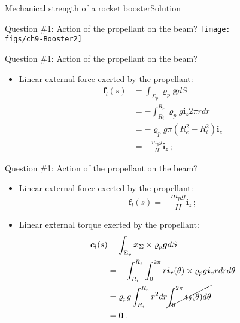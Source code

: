 \documentclass{beamer}
\newcommand{\id}{d}
\newcommand{\cj}{c}
\newcommand{\cv}{{\boldsymbol\cj}}
\newcommand{\xj}{x}
\newcommand{\zj}{z}
\newcommand{\xv}{{\boldsymbol\xj}}
\renewcommand{\ij}{i}
\newcommand{\iv}{{\boldsymbol\ij}}
\newcommand{\fj}{f}
\newcommand{\gj}{g}
\newcommand{\fv}{{\boldsymbol\fj}}
\newcommand{\gv}{{\boldsymbol\gj}}
\newcommand{\roi}{\varrho}
\newcommand{\bzero}{{\bf 0}}
\begin{document}
\begin{frame}{Mechanical strength of a rocket booster}{Solution}

\begin{overprint}

\vskip-20pt
\begin{exampleblock}{Question \#1: Action of the propellant on the beam?}
\vskip7pt
\centering\texttt{[image: \\figs/ch9-Booster2]}
\end{exampleblock}

\vskip-20pt
\begin{exampleblock}{Question \#1: Action of the propellant on the beam?}
\begin{itemize}
\item Linear external force exerted by the propellant:
\begin{displaymath}
\begin{split}
\fv_l(s) &=\int_{\Sigma_p}\roi_p\gv\id S \\
&=-\int_{R_i}^{R_e}\roi_p g\iv_\zj 2\pi r\id r \\
&=-\roi_p g\pi(R_e^2-R_i^2)\iv_\zj \\
&=-\frac{m_p g}{H}\iv_\zj\,;
\end{split}
\end{displaymath}
\end{itemize}
\end{exampleblock}

\vskip-20pt
\begin{exampleblock}{Question \#1: Action of the propellant on the beam?}
\begin{itemize}
\item Linear external force exerted by the propellant:
\begin{displaymath}
\fv_l(s) =-\frac{m_p g}{H}\iv_\zj\,;
\end{displaymath}
\item Linear external torque exerted by the propellant:
\begin{displaymath}
\begin{split}
\cv_l(s) &=\int_{\Sigma_p}\xv_\Sigma\times\roi_p\gv\id S \\
&=-\int_{R_i}^{R_e}\int_0^{2\pi}r\iv_r(\theta)\times\roi_p g\iv_\zj  r\id r\id\theta \\
&=\roi_p g\int_{R_i}^{R_e}r^2\id r\cancel{\int_0^{2\pi}\iv_\theta(\theta) \id\theta} \\
&=\bzero\,.
\end{split}
\end{displaymath}
\end{itemize}
\end{exampleblock}

\end{overprint}

\end{frame}
\end{document}
